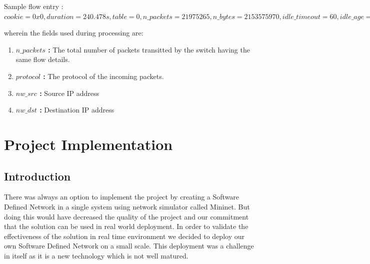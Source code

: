 \documentclass[12pt,a4paper,final]{report}
\begin{document}
\newpage
Sample flow entry :
\newline
$cookie=0x0, duration=240.478s, table=0, n\_packets=21975265, n\_bytes=2153575970, idle\_timeout=60, idle\_age=0, priority=65535,icmp,in\_port=2,vlan\_tci=0x0000,dl\_src=4a:06:64:e9:ef:f0,dl_dst=f2:57:bd:4c:19:28,nw\_src=10.0.0.2,nw\_dst=10.0.0.1,nw\_tos=0,icmp\_type=0,icmp\_code=0 actions=output:1$
\newline

wherein the fields used during processing are:
\begin{enumerate}
\item
\textbf{$n\_packets$ :}
\newline
The total number of packets transitted by the switch having the same flow details.

\item
\textbf{$protocol$ :}
\newline
The protocol of the incoming packets.

\item
\textbf{$nw\_src$ :}
\newline
Source IP address

\item
\textbf{$nw\_dst$ :}
\newline
Destination IP address
\end{enumerate}
\newpage

\chapter{Project Implementation}
\thispagestyle{empty}
\newpage

\section{Introduction}
There was always an option to implement the project by creating a Software Defined Network in a  single system using network simulator called Mininet. But doing this would have decreased the quality of the project and our commitment that the solution can be used in real world deployment. In order to validate the effectiveness of the solution in real time environment we decided to deploy our own Software Defined Network on a small scale. This deployment was a challenge in itself as it is a new technology which is not well matured.
\end{document}
